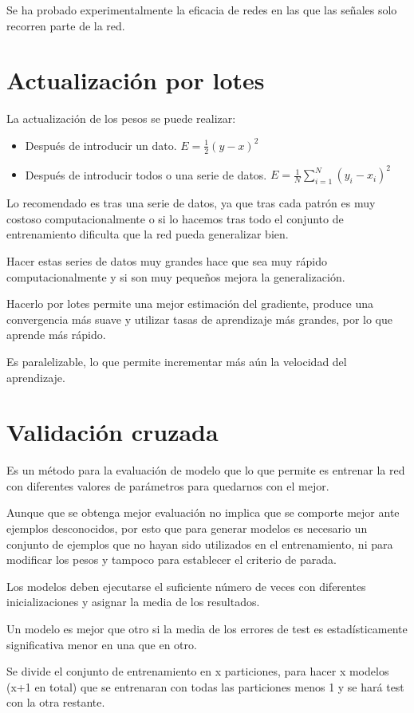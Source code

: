 \documentclass[12pt, twoside, openright]{report} %
\begin{document}
Se ha probado experimentalmente la eficacia de redes en las que las señales solo recorren parte de la red.

\section{Actualización por lotes}
La actualización de los pesos se puede realizar:
\begin{itemize}
	\item Después de introducir un dato. $E= \frac{1}{2} (y-x)^2$
	\item Después de introducir todos o una serie de datos. $E= \frac{1}{N} \sum_{i=1}^N(y_i-x_i)^2$
\end{itemize}
Lo recomendado es tras una serie de datos, ya que tras cada patrón es muy costoso computacionalmente o si lo hacemos tras todo el conjunto de entrenamiento dificulta que la red pueda generalizar bien.

Hacer estas series de datos muy grandes hace que sea muy rápido computacionalmente y si son muy pequeños mejora la generalización.

Hacerlo por lotes permite una mejor estimación del gradiente, produce una convergencia más suave y utilizar tasas de aprendizaje más grandes, por lo que aprende más rápido.

Es paralelizable, lo que permite incrementar más aún la velocidad del aprendizaje.

\section{Validación cruzada}
Es un método para la evaluación de modelo que lo que permite es entrenar la red con diferentes valores de parámetros para quedarnos con el mejor. 

Aunque que se obtenga mejor evaluación no implica que se comporte mejor ante ejemplos desconocidos, por esto que para generar modelos es necesario un conjunto de ejemplos que no hayan sido utilizados en el entrenamiento, ni para modificar los pesos y tampoco para establecer el criterio de parada. 

Los modelos deben ejecutarse el suficiente número de veces con diferentes inicializaciones y asignar la media de los resultados.

Un modelo es mejor que otro si la media de los errores de test es estadísticamente significativa menor en una que en otro.

Se divide el conjunto de entrenamiento en x particiones, para hacer x modelos (x+1 en total) que se entrenaran con todas las particiones menos 1 y se hará test con la otra restante.
\end{document}
